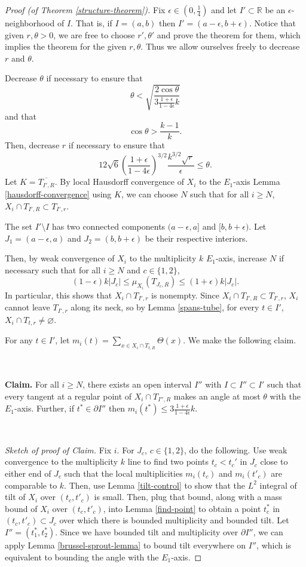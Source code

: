 \documentclass[10pt,a4paper]{amsart}
\begin{document}
\begin{proof}[Proof (of Theorem \ref{structure-theorem})] Fix $\epsilon \in (0,\frac{1}{4})$ and let $I' \subset \mathbb{R}$ be an $\epsilon$-neighborhood of $I$. That is, if $I = (a,b)$ then $I' = (a-\epsilon,b+\epsilon)$. Notice that given $r,\theta > 0$, we are free to choose $r', \theta'$ and prove the theorem for them, which implies the theorem for the given $r,\theta$. Thus we allow ourselves freely to decrease $r$ and $\theta$.

Decrease $\theta$ if necessary to ensure that
\[\theta < \sqrt{\frac{2\cos \theta}{3\frac{1+\epsilon}{1-4\epsilon}k}}\]
and that
\[ \cos \theta > \frac{k-1}{k}. \]
Then, decrease $r$ if necessary to ensure that 
\[12\sqrt{6} \left(\frac{1+\epsilon}{1-4\epsilon}\right)^{3/2}  \frac{k^{3/2}\sqrt{r}}{\epsilon} \leq \theta.\] 
Let $K = \overline{T_{I',R}}$. By local Hausdorff convergence of $X_i$ to the $E_1$-axis Lemma \ref{hausdorff-convergence} using $K$, we can choose $N$ such that for all $i \geq N$, $X_i \cap T_{I',R} \subset T_{I',r}$. 

The set $I' \setminus I$ has two connected components $(a-\epsilon,a]$ and $[b,b+\epsilon)$. Let $J_1 = (a-\epsilon,a)$ and $J_2 = (b,b+\epsilon)$ be their respective interiors. 

Then, by weak convergence of $X_i$ to the multiplicity $k$ $E_1$-axis, increase $N$ if necessary such that for all $i \geq N$ and $c \in \{1,2\}$,
\[(1-\epsilon)k |J_c| \leq \mu_{X_i}(T_{J_c,R}) \leq (1+\epsilon)k |J_c|.\]
In particular, this shows that $X_i \cap T_{I',r}$ is nonempty. Since $X_i \cap T_{I',R} \subset T_{I',r}$, $X_i$ cannot leave $T_{I',r}$ along its neck, so
by Lemma \ref{spans-tube}, for every $t \in I'$, $X_i \cap T_{t,r} \neq \varnothing$.

For any $t \in I'$, let $m_i(t) = \sum_{x \in X_i \cap T_{t,R}} \Theta(x)$. We make the following claim.

\ 

\textbf{Claim.} For all $i \geq N$, there exists an open interval $I''$ with $I \subset I'' \subset I'$ such that every tangent at a regular point of $X_i \cap T_{I'',R}$ makes an angle at most $\theta$ with the $E_1$-axis. Further, if $t^* \in \partial I''$ then
$m_i(t^*) \leq 3\frac{1+\epsilon}{1-4\epsilon} k.$

\

\emph{Sketch of proof of Claim.} Fix $i$. For $J_c$, $c \in \{1,2\}$, do the following. Use weak convergence to the multiplicity $k$ line to find two points $t_c < t_c'$ in $J_c$ close to either end of $J_c$ such that the local multiplicities $m_i(t_c)$ and $m_i(t'_c)$ are comparable to $k$. Then, use Lemma \ref{tilt-control} to show that the $L^2$ integral of tilt of $X_i$ over $(t_c,t'_c)$ is small. Then, plug that bound, along with a mass bound of $X_i$ over $(t_c,t'_c)$, into Lemma \ref{find-point} to obtain a point $t_c^*$ in $(t_c,t'_c) \subset J_c$ over which there is bounded multiplicity and bounded tilt. Let $I'' = (t_1^*,t_2^*).$ Since we have bounded tilt and multiplicity over $\partial I''$, we can apply Lemma \ref{brussel-sprout-lemma} to bound tilt everywhere on $I''$, which is equivalent to bounding the angle with the $E_1$-axis. 


\end{proof}
\end{document}
